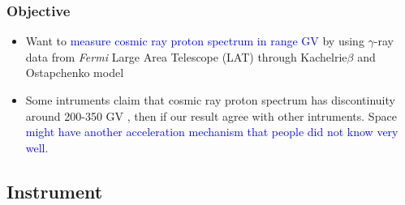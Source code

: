 \documentclass{beamer}
\begin{document}
\begin{frame}
\frametitle{Objective}
\begin{itemize}
  \item Want to \textcolor{blue}{measure cosmic ray proton spectrum in range GV} by using
  $\gamma$-ray data from \textit{Fermi} Large Area Telescope (LAT) through Kachelrie$\beta$ and Ostapchenko model
  \item Some intruments claim that cosmic ray proton spectrum has discontinuity around 200-350 GV
  , then if our result agree with other intruments. Space \textcolor{blue}{might have another acceleration mechanism that people did not know very well.}
\end{itemize}
\end{frame}


\subsection{Instrument}
\end{document}
